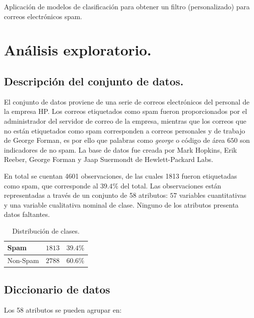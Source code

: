 \documentclass[12pt, letterpaper]{article}
\begin{document}
Aplicación de modelos de clasificación para obtener un filtro (personalizado) para correos electrónicos spam.

\section{Análisis exploratorio.}

\subsection{Descripción del conjunto de datos.}

El conjunto de datos proviene de una serie de correos electrónicos del personal de la empresa HP. Los correos etiquetados como spam fueron proporcionados por el administrador del servidor de correo de la empresa, mientras que los correos que no están etiquetados como spam corresponden a correos personales y de trabajo de George Forman, es por ello que palabras como \textit{george} o código de área $650$ son indicadores de no spam. La base de datos fue creada por Mark Hopkins, Erik Reeber, George Forman y Jaap Suermondt de Hewlett-Packard Labs.

En total se cuentan 4601 observaciones, de las cuales 1813 fueron etiquetadas como spam, que corresponde al $39.4\%$ del total. Las observaciones están representadas a través de un conjunto de 58 atributos: $57$ variables cuantitativas y una variable cualitativa nominal de clase. Ninguno de los atributos presenta datos faltantes. 

\begin{table}[ht]
\centering
\begin{tabular}{|l|l|l|}
\hline
Spam     & $1813$ & $39.4 \%$ \\ \hline
Non-Spam & $2788$ & $60.6 \%$ \\ \hline
\end{tabular}
\caption{Distribución de clases.}
\end{table}

\subsection{Diccionario de datos}

Los 58 atributos se pueden agrupar en:
\end{document}
